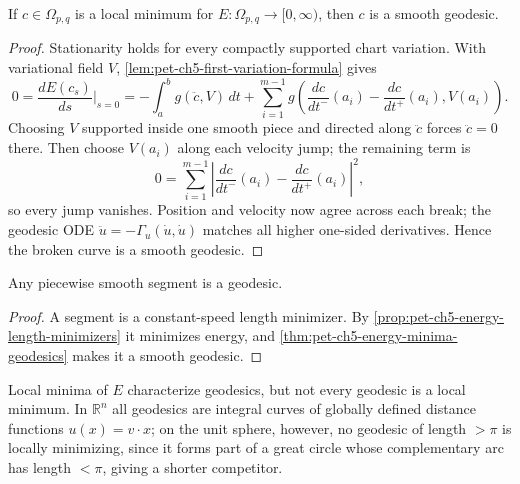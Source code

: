 \begin{theorem}
  \label{thm:pet-ch5-energy-minima-geodesics}
  \leanok
  If $c\in\Omega_{p,q}$ is a local minimum for $E:\Omega_{p,q}\to[0,\infty)$, then
  $c$ is a smooth geodesic.
\end{theorem}
\begin{proof}
  \leanok
  \sketch
  Stationarity holds for every compactly supported chart variation.  With
  variational field $V$, \cref{lem:pet-ch5-first-variation-formula} gives
  \[
    0=\frac{dE(c_s)}{ds}\Big|_{s=0}
    =-\int_a^bg(\ddot c,V)\,dt+\sum_{i=1}^{m-1}g\!\left(\frac{dc}{dt^-}(a_i)-\frac{dc}{dt^+}(a_i),V(a_i)\right).
  \]
  Choosing $V$ supported inside one smooth piece and directed along $\ddot c$
  forces $\ddot c=0$ there.  Then choose $V(a_i)$ along each velocity jump; the
  remaining term is
  \[
    0=\sum_{i=1}^{m-1}\left|\frac{dc}{dt^-}(a_i)-\frac{dc}{dt^+}(a_i)\right|^2,
  \]
  so every jump vanishes.  Position and velocity now agree across each break; the
  geodesic ODE $\ddot u=-\Gamma_u(\dot u,\dot u)$ matches all higher one-sided
  derivatives.  Hence the broken curve is a smooth geodesic.
\end{proof}

\begin{corollary}
  \label{cor:pet-ch5-segments-are-geodesics}
  \leanok
  Any piecewise smooth segment is a geodesic.
\end{corollary}
\begin{proof}
  \leanok
  \sketch
  A segment is a constant-speed length minimizer.  By
  \cref{prop:pet-ch5-energy-length-minimizers} it minimizes energy, and
  \cref{thm:pet-ch5-energy-minima-geodesics} makes it a smooth geodesic.
\end{proof}

\begin{remark}
  \label{rem:pet-ch5-sphere-not-locally-minimizing}
  Local minima of $E$ characterize geodesics, but not every geodesic is a local
  minimum. In $\mathbb R^n$ all geodesics are integral curves of globally defined
  distance functions $u(x)=v\cdot x$; on the unit sphere, however, no geodesic of
  length $>\pi$ is locally minimizing, since it forms part of a great circle whose
  complementary arc has length $<\pi$, giving a shorter competitor.
\end{remark}

